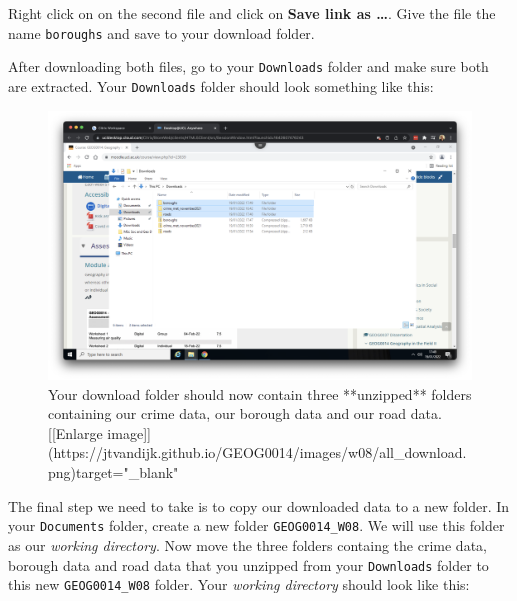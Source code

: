 \documentclass[
]{book}
\begin{document}
Right click on on the second file and click on \textbf{Save link as \ldots{}}. Give the file the name \texttt{boroughs} and save to your download folder.

After downloading both files, go to your \texttt{Downloads} folder and make sure both are extracted. Your \texttt{Downloads} folder should look something like this:

\begin{figure}

{\centering \includegraphics[width=850pt]{images/w08/all_download} 

}

\caption{Your download folder should now contain three **unzipped** folders containing our crime data, our borough data and our road data. [[Enlarge image]](https://jtvandijk.github.io/GEOG0014/images/w08/all_download.png){target="_blank"}}\label{fig:your-downloads}
\end{figure}

The final step we need to take is to copy our downloaded data to a new folder. In your \texttt{Documents} folder, create a new folder \texttt{GEOG0014\_W08}. We will use this folder as our \emph{working directory}. Now move the three folders containg the crime data, borough data and road data that you unzipped from your \texttt{Downloads} folder to this new \texttt{GEOG0014\_W08} folder. Your \emph{working directory} should look like this:
\end{document}
